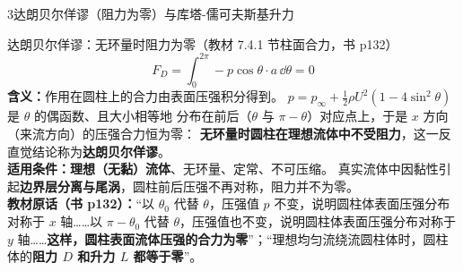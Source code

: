 \begin{kaodian}{3}{达朗贝尔佯谬（阻力为零）与库塔-儒可夫斯基升力}
\begin{gongshi}{达朗贝尔佯谬：无环量时阻力为零（教材 7.4.1 节柱面合力，书 p132）}
\[ F_D=\int_0^{2\pi}-p\cos\theta\cdot a\,\dd\theta=0 \]
\textbf{含义：}作用在圆柱上的合力由表面压强积分得到。
$p=p_\infty+\frac12\rho U^2(1-4\sin^2\theta)$ 是 $\theta$ 的偶函数、且大小相等地
分布在前后（$\theta$ 与 $\pi-\theta$）对应点上，于是 $x$ 方向（来流方向）的压强合力恒为零：
\textbf{无环量时圆柱在理想流体中不受阻力}，这一反直觉结论称为\textbf{达朗贝尔佯谬}。\\
\textbf{适用条件：}\textbf{理想（无黏）流体}、无环量、定常、不可压缩。
真实流体中因黏性引起\textbf{边界层分离与尾涡}，圆柱前后压强不再对称，阻力并不为零。\\
\textbf{教材原话（书 p132）：}“以 $\theta_0$ 代替 $\theta$，压强值 $p$ 不变，说明圆柱体表面压强分布对称于 $x$ 轴……以 $\pi-\theta_0$ 代替 $\theta$，压强值也不变，说明圆柱体表面压强分布对称于 $y$ 轴……\textbf{这样，圆柱表面流体压强的合力为零}”；“理想均匀流绕流圆柱体时，圆柱体的\textbf{阻力 $D$ 和升力 $L$ 都等于零}”。
\end{gongshi}


\end{kaodian}
